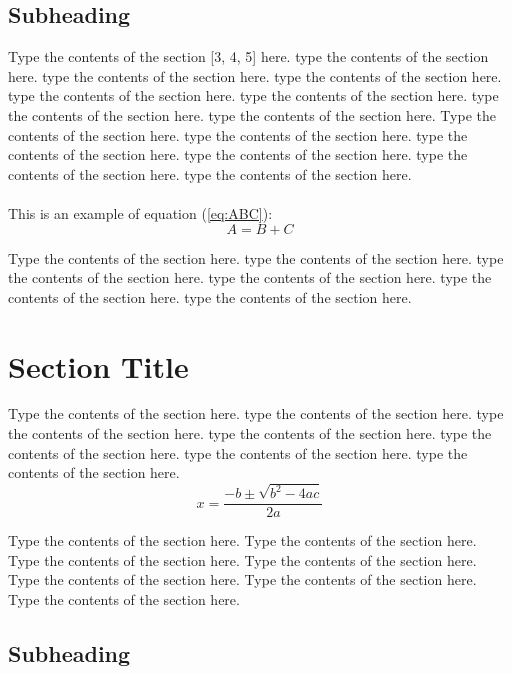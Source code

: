 \documentclass[twoside,twocolumn]{article}
\begin{document}
\subsection{Subheading}
Type the contents of the section [3, 4, 5] here.  type the contents of the section here.  type the contents of the section here.  type the contents of the section here.  type the contents of the section here.  type the contents of the section here.  type the contents of the section here.  type the contents of the section here.  Type the contents of the section here. type the contents of the section here.  type the contents of the section here.  type the contents of the section here.  type the contents of the section here.  type the contents of the section here. \\ \\
This is an example of equation (\ref{eq:ABC}):
\begin{equation}
\label{eq:ABC}
A=B+C
\end{equation}

Type the contents of the section here.  type the contents of the section here.  type the contents of the section here.  type the contents of the section here.  type the contents of the section here.  type the contents of the section here.

\section{Section Title}

Type the contents of the section here.  type the contents of the section here.  type the contents of the section here.  type the contents of the section here.  type the contents of the section here.  type the contents of the section here.  type the contents of the section here. 
\begin{equation}
\label{eq:delta}
x =  \dfrac{-b\pm\sqrt{b^2-4ac}}{2a}
\end{equation}

Type the contents of the section here.  Type the contents of the section here.  Type the contents of the section here.  Type the contents of the section here.  Type the contents of the section here.  Type the contents of the section here.  Type the contents of the section here. 

\subsection{Subheading}
\end{document}
